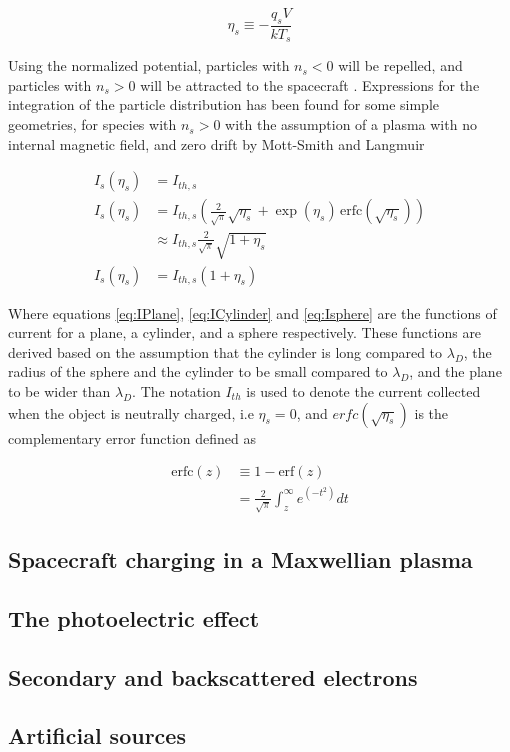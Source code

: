 \begin{equation}\label{eq:normPot}
    \eta_s \equiv - \frac{q_s V}{k T_s}
\end{equation}

Using the normalized potential, particles with $n_s < 0$ will be repelled, and particles with $n_s > 0$ will be attracted to the spacecraft . Expressions for the integration of the particle distribution has been found for some simple geometries, for species with $n_s > 0$ with the assumption of a plasma with no internal magnetic field, and zero drift by Mott-Smith and Langmuir 

\begin{subequations}
    \begin{align}
        I_s (\eta_s) &= I_{th,s} \label{eq:IPlane} \\
        I_s (\eta_s) &= I_{th,s} \left(\frac{2}{\sqrt{\pi}} \sqrt{\eta_s} + \exp(\eta_s) \hspace{2pt} \text{erfc}(\sqrt{\eta_s}) \right) \label{eq:ICylinder}\\
        & \approx I_{th,s} \frac{2}{\sqrt{\pi}} \sqrt{1 + \eta_s} \\
        I_s(\eta_s)  &= I_{th,s} (1 + \eta_s) \label{eq:Isphere}
    \end{align}
\end{subequations}

Where equations \ref{eq:IPlane}, \ref{eq:ICylinder} and \ref{eq:Isphere} are the functions of current for a plane, a cylinder, and a sphere respectively. These functions are derived based on the assumption that the cylinder is long compared to $\lambda_D$, the radius of the sphere and the cylinder to be small compared to $\lambda_D$, and the plane to be wider than $\lambda_D$. The notation $I_{th}$ is used to denote the current collected when the object is neutrally charged, i.e $\eta_s = 0$, and $erfc(\sqrt{\eta_s})$ is the complementary error function defined as

\begin{subequations}
    \begin{align*}
        \text{erfc}(z) &\equiv 1 - \text{erf}(z) \\
        &= \frac{2}{\sqrt{\pi}} \int^\infty_z e^(-t^2) dt
    \end{align*}
\end{subequations}


\subsection*{Spacecraft charging in a Maxwellian plasma}


\subsection*{The photoelectric effect}

\subsection*{Secondary and backscattered electrons}

\subsection*{Artificial sources}
